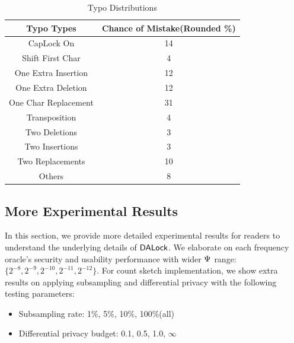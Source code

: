 \begin{table}[h]
	\begin{tabular}{|c|c|}
		\hline
		Typo Types           & Chance of Mistake(Rounded \%) \\ \hline
		CapLock On           & 14                            \\ \hline
		Shift First Char     & 4                             \\ \hline
		One Extra Insertion  & 12                            \\ \hline
		One Extra Deletion   & 12                            \\ \hline
		One Char Replacement & 31                            \\ \hline
		Transposition        & 4                             \\ \hline
		Two Deletions         & 3                             \\ \hline
		Two Insertions        & 3                             \\ \hline
		Two Replacements      & 10                            \\ \hline
		Others               & 8                             \\ \hline
	\end{tabular}
	\caption{Typo Distributions\cite{CCS:CWPCR17}}
	\label{Table:TypoTypes}
	\vspace{-0.5cm}
\end{table}	

	\vspace{-0.5cm}
\subsection{More Experimental Results}\label{appendix:experimentalResults}
In this section, we provide more detailed experimental results for readers to understand the underlying details of $\mathsf{DALock}$. We elaborate on each frequency oracle's security and usability performance with wider $\Psi$ range: $\{2^{-8}, 2^{-9},2^{-10},2^{-11}, 2^{-12}\}$. For count sketch implementation, we show extra results on applying subsampling and differential privacy with the following testing parameters:
\begin{itemize}
	\item Subsampling rate: 1\%, 5\%, 10\%, 100\%(all)
	\item Differential privacy budget: 0.1, 0.5, 1.0, $\infty$
\end{itemize}

